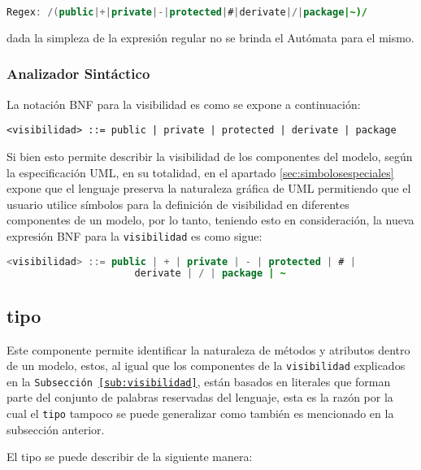 \begin{lstlisting}[language=Java, basicstyle=\footnotesize\ttfamily]
	Regex: /(public|+|private|-|protected|#|derivate|/|package|~)/
\end{lstlisting}

dada la simpleza de la expresión regular no se brinda el Autómata para el
mismo.

\subsubsection{Analizador Sintáctico}
La notación BNF para la visibilidad es como se expone a continuación:

\begin{lstlisting}[basicstyle=\footnotesize\ttfamily, caption={BNF -
visibilidad (v1)}]
  <visibilidad> ::= public | private | protected | derivate | package
\end{lstlisting}

Si bien esto permite describir la visibilidad de los componentes del modelo,
según la especificación UML, en su totalidad, en el apartado
\ref{sec:simbolosespeciales} expone que el lenguaje preserva la naturaleza
gráfica de UML permitiendo que el usuario utilice símbolos para la definición
de visibilidad en diferentes componentes de un modelo, por lo tanto, teniendo
esto en consideración, la nueva expresión BNF para la \texttt{visibilidad} es
como sigue:

\begin{lstlisting}[language=Java, basicstyle=\footnotesize\ttfamily,
caption={BNF - visibilidad (final)}]
  <visibilidad> ::= public | + | private | - | protected | # |
	                  derivate | / | package | ~
\end{lstlisting}

\subsection{tipo}
\label{sub:tipo}
Este componente permite identificar la naturaleza de métodos y atributos dentro
de un modelo, estos, al igual que los componentes de la \texttt{visibilidad}
explicados en la \texttt{Subsección \ref{sub:visibilidad}}, están basados en
literales que forman parte del conjunto de palabras reservadas del lenguaje,
esta es la razón por la cual el \texttt{tipo} tampoco se puede generalizar como
también es mencionado en la subsección anterior.

El tipo se puede describir de la siguiente manera:

